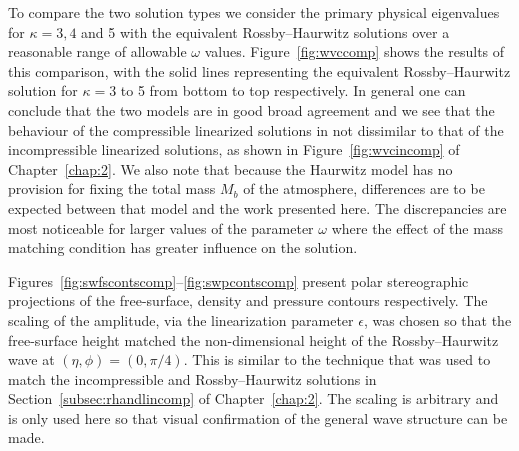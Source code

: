 To compare the two solution types we consider the primary physical eigenvalues for $\kappa=3,4$ and 5 with the equivalent Rossby--Haurwitz solutions over a reasonable range of allowable $\omega$ values. Figure~\ref{fig:wvccomp} shows the results of this comparison, with the solid lines representing the equivalent Rossby--Haurwitz solution for $\kappa=3$ to 5 from bottom to top respectively. In general one can conclude that the two models are in good broad agreement and we see that the behaviour of the compressible linearized solutions in not dissimilar to that of the incompressible linearized solutions, as shown in Figure~\ref{fig:wvcincomp} of Chapter~\ref{chap:2}. We also note that because the Haurwitz model has no provision for fixing the total mass $M_b$ of the atmosphere, differences are to be expected between that model and the work presented here. The discrepancies are most noticeable for larger values of the parameter $\omega$ where the effect of the mass matching condition has greater influence on the solution.

Figures~\ref{fig:swfscontscomp}--\ref{fig:swpcontscomp} present polar stereographic projections of the free-surface, density and pressure contours respectively. The scaling of the amplitude, via the linearization parameter $\epsilon$, was chosen so that the free-surface height matched the non-dimensional height of the Rossby--Haurwitz wave at $(\eta,\phi)=(0,\pi/4)$. This is similar to the technique that was used to match the incompressible and Rossby--Haurwitz solutions in Section~\ref{subsec:rhandlincomp} of Chapter~\ref{chap:2}. The scaling is arbitrary and is only used here so that visual confirmation of the general wave structure can be made.

